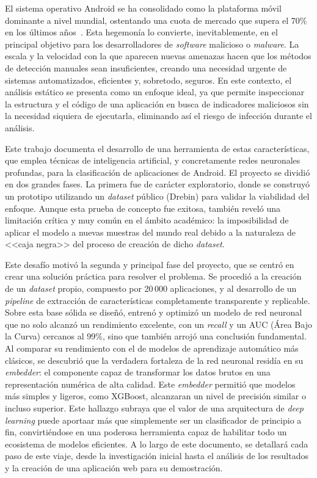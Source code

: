 
El sistema operativo Android se ha consolidado como la plataforma móvil dominante a nivel mundial, ostentando una cuota de mercado que supera el 70\% en los últimos años~\cite{statcounterAndroid2025}. Esta hegemonía lo convierte, inevitablemente, en el principal objetivo para los desarrolladores de \textit{software} malicioso o \textit{malware}. La escala y la velocidad con la que aparecen nuevas amenazas hacen que los métodos de detección manuales sean insuficientes, creando una necesidad urgente de sistemas automatizados, eficientes y, sobretodo, seguros. En este contexto, el análisis estático se presenta como un enfoque ideal, ya que permite inspeccionar la estructura y el código de una aplicación en busca de indicadores maliciosos sin la necesidad siquiera de ejecutarla, eliminando así el riesgo de infección durante el análisis.

Este trabajo documenta el desarrollo de una herramienta de estas características, que emplea técnicas de inteligencia artificial, y concretamente redes neuronales profundas, para la clasificación de aplicaciones de Android. El proyecto se dividió en dos grandes fases. La primera fue de carácter exploratorio, donde se construyó un prototipo utilizando un \textit{dataset} público (Drebin) para validar la viabilidad del enfoque. Aunque esta prueba de concepto fue exitosa, también reveló una limitación crítica y muy común en el ámbito académico: la imposibilidad de aplicar el modelo a nuevas muestras del mundo real debido a la naturaleza de <<caja negra>> del proceso de creación de dicho \textit{dataset}.

Este desafío motivó la segunda y principal fase del proyecto, que se centró en crear una solución práctica para resolver el problema. Se procedió a la creación de un \textit{dataset} propio, compuesto por 20\,000 aplicaciones, y al desarrollo de un \textit{pipeline} de extracción de características completamente transparente y replicable. Sobre esta base sólida se diseñó, entrenó y optimizó un modelo de red neuronal que no solo alcanzó un rendimiento excelente, con un \textit{recall} y un AUC (Área Bajo la Curva) cercanos al 99\%, sino que también arrojó una conclusión fundamental. Al comparar su rendimiento con el de modelos de aprendizaje automático más clásicos, se descubrió que la verdadera fortaleza de la red neuronal residía en su \textit{embedder}: el componente capaz de transformar los datos brutos en una representación numérica de alta calidad. Este \textit{embedder} permitió que modelos más simples y ligeros, como XGBoost, alcanzaran un nivel de precisión similar o incluso superior. Este hallazgo subraya que el valor de una arquitectura de \textit{deep learning} puede aportaar más que simplemente ser un clasificador de principio a fin, convirtiéndose en una poderosa herramienta capaz de habilitar todo un ecosistema de modelos eficientes. A lo largo de este documento, se detallará cada paso de este viaje, desde la investigación inicial hasta el análisis de los resultados y la creación de una aplicación web para su demostración.
